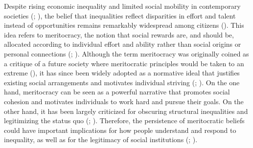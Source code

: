 \documentclass[
  13pt,
]{article}
\begin{document}
Despite rising economic inequality and limited social mobility in
contemporary societies (; ), the belief that inequalities reflect disparities in
effort and talent instead of opportunities remains remarkably widespread
among citizens (). This idea
refers to meritocracy, the notion that social rewards are, and should
be, allocated according to individual effort and ability rather than
social origins or personal connections
(;
). Although the term
meritocracy was originally coined as a critique of a future society
where meritocratic principles would be taken to an extreme
(), it has since been widely
adopted as a normative ideal that justifies existing social arrangements
and motivates individual striving
(;
). On the one hand,
meritocracy can be seen as a powerful narrative that promotes social
cohesion and motivates individuals to work hard and pursue their goals.
On the other hand, it has been largely criticized for obscuring
structural inequalities and legitimizing the status quo
(;
). Therefore, the persistence of meritocratic beliefs could have
important implications for how people understand and respond to
inequality, as well as for the legitimacy of social institutions
(;
).
\end{document}

